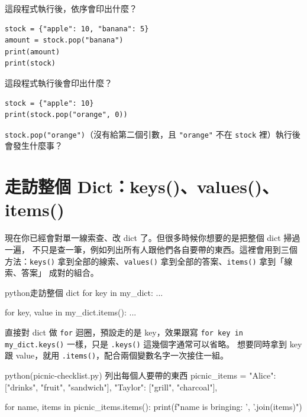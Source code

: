 \begin{drills}[label=drills:dict-pop]
\item 這段程式執行後，依序會印出什麼？
\begin{verbatim}
stock = {"apple": 10, "banana": 5}
amount = stock.pop("banana")
print(amount)
print(stock)
\end{verbatim}
\item 這段程式執行後會印出什麼？
\begin{verbatim}
stock = {"apple": 10}
print(stock.pop("orange", 0))
\end{verbatim}
\item \texttt{stock.pop("orange")}（沒有給第二個引數，且 \texttt{"orange"} 不在
\texttt{stock} 裡）執行後會發生什麼事？
\end{drills}

\section{走訪整個 Dict：keys()、values()、items()}
\label{sec:dict-iterate}

現在你已經會對單一線索查、改 dict 了。但很多時候你想要的是把整個 dict 掃過一遍，
不只是查一筆，例如列出所有人跟他們各自要帶的東西。這裡會用到三個方法：\texttt{keys()}
拿到全部的線索、\texttt{values()} 拿到全部的答案、\texttt{items()} 拿到「線索、答案」
成對的組合。

\begin{code}{python}{走訪整個 dict}
for key in my_dict:
    ...

for key, value in my_dict.items():
    ...
\end{code}

直接對 dict 做 \texttt{for} 迴圈，預設走的是 key，效果跟寫
\texttt{for key in my\_dict.keys()} 一樣，只是 \texttt{.keys()} 這幾個字通常可以省略。
想要同時拿到 key 跟 value，就用 \texttt{.items()}，配合兩個變數名字一次接住一組。

\begin{example}{python}{(picnic-checklist.py) 列出每個人要帶的東西}
picnic_items = {
    "Alice": ["drinks", "fruit", "sandwich"],
    "Taylor": ["grill", "charcoal"],
}

for name, items in picnic_items.items():
    print(f"{name} is bringing: {', '.join(items)}")
\end{example}


